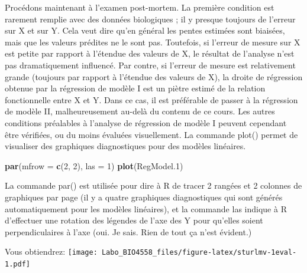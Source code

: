 \documentclass[
  12pt,
]{book}
\newenvironment{Shaded}{\begin{snugshade}}{\end{snugshade}}
\newcommand{\DataTypeTok}[1]{\textcolor[rgb]{0.13,0.29,0.53}{#1}}
\newcommand{\DecValTok}[1]{\textcolor[rgb]{0.00,0.00,0.81}{#1}}
\newcommand{\FloatTok}[1]{\textcolor[rgb]{0.00,0.00,0.81}{#1}}
\newcommand{\KeywordTok}[1]{\textcolor[rgb]{0.13,0.29,0.53}{\textbf{#1}}}
\newcommand{\NormalTok}[1]{#1}
\begin{document}
Procédons maintenant à l'examen post-mortem. La première
condition est rarement remplie avec des données biologiques ; il y
presque toujours de l'erreur sur X et sur Y. Cela veut dire qu'en
général les pentes estimées sont biaisées, mais que les valeurs prédites
ne le sont pas. Toutefois, si l'erreur de mesure sur X est petite par
rapport à l'étendue des valeurs de X, le résultat de l'analyse n'est pas
dramatiquement influencé. Par contre, si l'erreur de mesure est
relativement grande (toujours par rapport à l'étendue des valeurs de
X), la droite de régression obtenue par la régression de modèle I est
un piètre estimé de la relation fonctionnelle entre X et Y. Dans ce cas,
il est préférable de passer à la régression de modèle II,
malheureusement au-delà du contenu de ce cours.
Les autres conditions préalables à l'analyse de régression de modèle I
peuvent cependant être vérifiées, ou du moins évaluées visuellement.
La commande plot() permet de visualiser des graphiques
diagnostiques pour des modèles linéaires.

\begin{Shaded}
\begin{Highlighting}[]
\KeywordTok{par}\NormalTok{(}\DataTypeTok{mfrow =} \KeywordTok{c}\NormalTok{(}\DecValTok{2}\NormalTok{, }\DecValTok{2}\NormalTok{), }\DataTypeTok{las =} \DecValTok{1}\NormalTok{)}
\KeywordTok{plot}\NormalTok{(RegModel}\FloatTok{.1}\NormalTok{)}
\end{Highlighting}
\end{Shaded}

La commande par() est utilisée pour dire à R de tracer 2 rangées et 2 colonnes de graphiques par page (il y a quatre graphiques diagnostiques qui sont générés automatiquement pour les modèles linéaires), et la commande las indique à R d'effectuer une rotation des légendes de l'axe des Y pour qu'elles soient perpendiculaires à l'axe (oui. Je sais. Rien de tout ça n'est évident.)

Vous obtiendrez:
\texttt{[image: Labo\_BIO4558\_files/figure-latex/sturlmv-1eval-1.pdf]}
\end{document}
